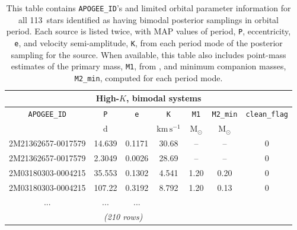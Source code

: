 \documentclass[modern, letterpaper]{aastex62}
\newcommand{\nbimodal}{113}
\begin{document}
\begin{table}[ht]
    \centering
    \begin{tabular}{c | c | c | c | c | c | c}
    \multicolumn{7}{c}{\textbf{High-$K$, bimodal systems}}\\
    \hline
    \texttt{APOGEE\_ID} & \texttt{P} & \texttt{e} & \texttt{K} &
        \texttt{M1} & \texttt{M2\_min} & \texttt{clean\_flag} \\
    & $\mathrm{d}$ & & $\mathrm{km\,s^{-1}}$ &
        $\mathrm{M_{\odot}}$ & $\mathrm{M_{\odot}}$ &  \\
    \hline
    2M21362657-0017579 & 14.639 & 0.1171 & 30.68 & -- & -- & 0 \\
    2M21362657-0017579 & 2.3049 & 0.0026 & 28.69 & -- & -- & 0 \\
    2M03180303-0004215 & 35.553 & 0.1302 & 4.541 & 1.20 & 0.20 & 0 \\
    2M03180303-0004215 & 107.22 & 0.3192 & 8.792 & 1.20 & 0.13 & 0 \\
    ... & ... & ... \\
    \hline
    \multicolumn{6}{c}{\textit{(210 rows)}}
    \end{tabular}
    \caption{This table contains \texttt{APOGEE\_ID}'s and limited orbital
    parameter information for all \nbimodal\ stars identified as having bimodal
    posterior samplings in orbital period.
    Each source is listed twice, with MAP values of period, \texttt{P},
    eccentricity, \texttt{e}, and velocity semi-amplitude, \texttt{K}, from each
    period mode of the posterior sampling for the source.
    When available, this table also includes point-mass estimates of the primary
    mass, \texttt{M1}, from \citet{Ness:2015}, and minimum companion masses,
    \texttt{M2\_min}, computed for each period mode.
    }
    \label{tbl:highK-bimodal}
\end{table}

\clearpage
\end{document}
